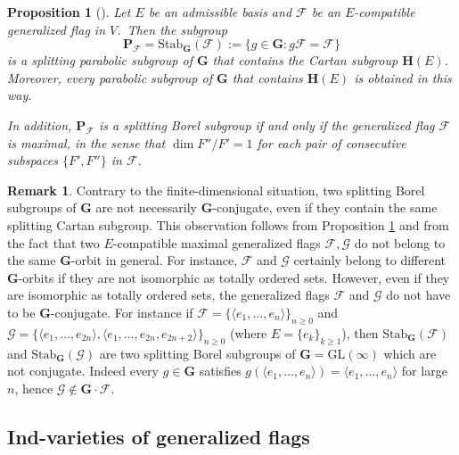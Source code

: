 \documentclass[12pt]{amsart}
\newcommand{\GL}{\mathrm{GL}}
\newcommand{\G}{\mathbf{G}}
\renewcommand{\H}{\mathbf{H}}
\renewcommand{\P}{\mathbf{P}}
\newcommand{\Ff}{\mathcal{F}}
\newcommand{\Gg}{\mathcal{G}}
\newcommand{\os}{\Sigma}
\renewcommand{\span}[1]{\langle #1\rangle}
\newcommand{\Stab}{\mathrm{Stab}}
\numberwithin{equation}{section}
\newtheorem{proposition}[theorem]{Proposition}
\theoremstyle{definition}
\newtheorem{remark}[theorem]{Remark}
\begin{document}
\begin{proposition}[{\cite{Dimitrov-Penkov}}]
\label{P0}
Let $E$ be an admissible basis and $\Ff$ be an $E$-compatible generalized flag in $V$.\ Then the subgroup
\[\P_\Ff=\mathrm{Stab}_\G(\Ff):=\{g\in \G:g\Ff=\Ff\}\]
is a splitting parabolic subgroup of $\G$ that contains the Cartan subgroup $\H(E)$. Moreover, every parabolic subgroup of $\G$ that contains $\H(E)$ is obtained in this way.

In addition, $\P_\Ff$ is a splitting Borel subgroup if and only if the generalized flag $\Ff$ is maximal, in the sense that $\dim F''/F'=1$ for each pair of consecutive subspaces $\{F',F''\}$ in $\Ff$.
\end{proposition}

\begin{remark}
Contrary to the finite-dimensional situation, two splitting Borel subgroups of $\G$ are not necessarily $\G$-conjugate, even if they contain the same splitting Cartan subgroup. This observation follows from Proposition \ref{P0} and from the fact that two $E$-compatible maximal generalized flags $\Ff,\Gg$ do not belong to the same $\G$-orbit in general. For instance, $\Ff$ and $\Gg$ certainly belong to different $\G$-orbits if they are not isomorphic as totally ordered sets. However, even if they are isomorphic as totally ordered sets, 
the generalized flags $\Ff$ and $\Gg$ do not have to be $\G$-conjugate.
For instance if $\Ff=\{\span{e_1,\ldots,e_n}\}_{n\geq 0}$ and
$\Gg=\{\span{e_1,\ldots,e_{2n}},\span{e_1,\ldots,e_{2n},e_{2n+2}}\}_{n\geq 0}$
(where $E=\{e_k\}_{k\geq 1}$), then $\Stab_\G(\Ff)$ and $\Stab_\G(\Gg)$ are two splitting Borel subgroups of $\G=\GL(\infty)$ which are not conjugate.
Indeed every $g\in \G$ satisfies $g(\span{e_1,\ldots,e_n})=\span{e_1,\ldots,e_n}$ for large $n$, hence $\Gg\notin\G\cdot\Ff$.



\end{remark}



\subsection{Ind-varieties of generalized flags}
\label{section-2.3}
\end{document}
